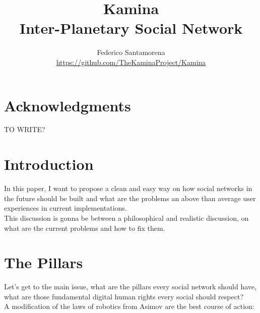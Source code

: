 \documentclass[12pt]{article}
\begin{document}
\title
{
    Kamina \\
    Inter-Planetary Social Network \\
}
\author
{
    Federico Santamorena \\
    \href{https://github.com/TheKaminaProject/Kamina}{https://github.com/TheKaminaProject/Kamina} \\ 
}
\maketitle



\section{Acknowledgments}
TO WRITE?

\section{Introduction}

In this paper, I want to propose a clean and easy way on how social networks in the future should be built and what are the problems an above than average user experiences in current implementations. \\
This discussion is gonna be between a philosophical and realistic discussion, on what are the current problems and how to fix them.


\newpage

\section{The Pillars}

Let's get to the main issue, what are the pillars every social network should have, what are those fundamental digital human rights every social should respect? \\
A modification of the laws of robotics from Asimov are the best course of action:
\end{document}
